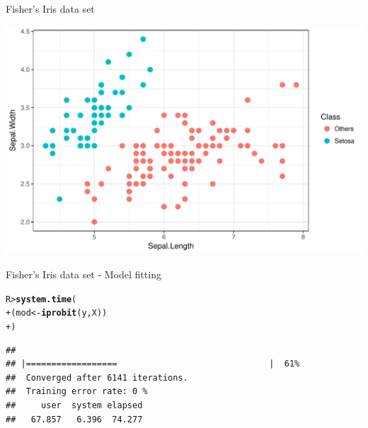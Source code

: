\documentclass{beamer}\usepackage[]{graphicx}\usepackage[]{color}
\makeatletter
\def\maxwidth{ %
  \ifdim\Gin@nat@width>\linewidth
    \linewidth
  \else
    \Gin@nat@width
  \fi
}
\newcommand{\hlstd}[1]{\textcolor[rgb]{0.345,0.345,0.345}{#1}}%
\newcommand{\hlkwb}[1]{\textcolor[rgb]{0.69,0.353,0.396}{#1}}%
\newcommand{\hlkwd}[1]{\textcolor[rgb]{0.737,0.353,0.396}{\textbf{#1}}}%
\newenvironment{kframe}{%
 \def\at@end@of@kframe{}%
 \ifinner\ifhmode%
  \def\at@end@of@kframe{\end{minipage}}%
  \begin{minipage}{\columnwidth}%
 \fi\fi%
 \def\FrameCommand##1{\hskip\@totalleftmargin \hskip-\fboxsep
 \colorbox{shadecolor}{##1}\hskip-\fboxsep
     \hskip-\linewidth \hskip-\@totalleftmargin \hskip\columnwidth}%
 \MakeFramed {\advance\hsize-\width
   \@totalleftmargin\z@ \linewidth\hsize
   \@setminipage}}%
 {\par\unskip\endMakeFramed%
 \at@end@of@kframe}
\newenvironment{knitrout}{}{} %
\makeatother
\begin{document}
\begin{frame}[fragile]{Fisher's Iris data set}
\begin{knitrout}\small
{}\color{fgcolor}

{\centering \includegraphics[width=\maxwidth]{figure/data_iris-1} 

}



\end{knitrout}
\end{frame}


\begin{frame}[fragile]{Fisher's Iris data set - Model fitting}
\begin{knitrout}\small
{}\color{fgcolor}\begin{kframe}
\begin{alltt}
\hlstd{R> }\hlkwd{system.time}\hlstd{(}
\hlstd{+ }  \hlstd{(mod} \hlkwb{<-} \hlkwd{iprobit}\hlstd{(y, X))}
\hlstd{+ }\hlstd{)}
\end{alltt}
\end{kframe}
\end{knitrout}
\begin{knitrout}\small
{}\color{fgcolor}\begin{kframe}
\begin{verbatim}
## 
## |==================                              |  61%
##  Converged after 6141 iterations.
##  Training error rate: 0 %
##     user  system elapsed
##   67.857   6.396  74.277
\end{verbatim}
\end{kframe}
\end{knitrout}
\end{frame}
\end{document}
